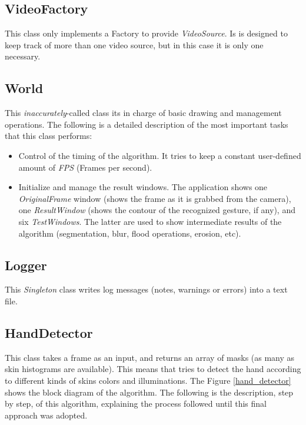 \documentclass[11pt,a4paper]{article}
\begin{document}
\subsection{VideoFactory}
This class only implements a Factory to provide \textit{VideoSource}. Is is designed to keep track of more than one video source, but in this case it is only one necessary.

\subsection{World}
This \textit{inaccurately}-called class its in charge of basic drawing and management operations. The following is a detailed description of the most important tasks that this class performs:
\begin{itemize}
\item Control of the timing of the algorithm. It tries to keep a constant user-defined amount of \textit{FPS} (Frames per second).
\item Initialize and manage the result windows. The application shows one \textit{OriginalFrame} window (shows the frame as it is grabbed from the camera), one \textit{ResultWindow} (shows the contour of the recognized gesture, if any), and six \textit{TestWindows}. The latter are used to show intermediate results of the algorithm (segmentation, blur, flood operations, erosion, etc).
\end{itemize}


\subsection{Logger}
This \textit{Singleton} class writes log messages (notes, warnings or errors) into a text file.

\subsection{HandDetector}
This class takes a frame as an input, and returns an array of masks (as many as skin histograms are available). This means that tries to detect the hand according to different kinds of skins colors and illuminations. The Figure \ref{hand_detector} shows the block diagram of the algorithm. The following is the description, step by step, of this algorithm, explaining the process followed until this final approach was adopted.\\
\end{document}
